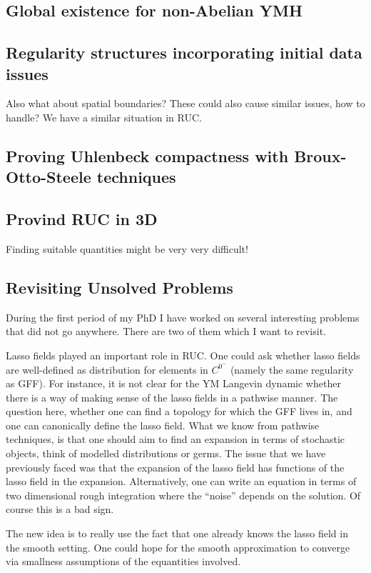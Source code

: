 \documentclass[11pt]{article}
\numberwithin{equation}{section}
\theoremstyle{definition}
\theoremstyle{remark}
\newcommand{\1}{\mathbf 1}
\newcommand{\<}{\langle}
\renewcommand{\>}{\rangle}
\begin{document}
\subsection{Global existence for non-Abelian YMH}

\subsection{Regularity structures incorporating initial data issues}
Also what about spatial boundaries? These could also cause similar issues, how to handle? We have a similar situation in RUC. 

\subsection{Proving Uhlenbeck compactness with Broux-Otto-Steele techniques}


\subsection{Provind RUC in 3D}
Finding suitable quantities might be very very difficult! 

\subsection{Revisiting Unsolved Problems}
During the first period of my PhD I have worked on several interesting problems that did not go anywhere. There are two of them which I want to revisit. 

Lasso fields played an important role in RUC. One could ask whether lasso fields are well-defined as distribution for elements in $C^{0^-}$ (namely the same regularity as GFF). For instance, it is not clear for the YM Langevin dynamic whether there is a way of making sense of the lasso fields in a pathwise manner. The question here, whether one can find a topology for which the GFF lives in, and one can canonically define the lasso field. What we know from pathwise techniques, is that one should aim to find an expansion in terms of stochastic objects, think of modelled distributions or germs. The issue that we have previously faced was that the expansion of the lasso field has functions of the lasso field in the expansion. Alternatively, one can write an equation in terms of two dimensional rough integration where the ``noise'' depends on the solution. Of course this is a bad sign. 

The new idea is to really use the fact that one already knows the lasso field in the smooth setting. One could hope for the smooth approximation to converge via smallness assumptions of the equantities involved. 
\end{document}
